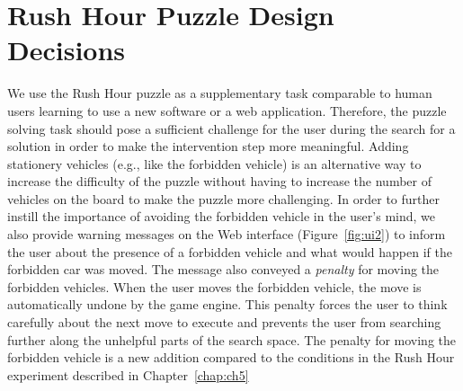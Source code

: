 \section{Rush Hour Puzzle Design Decisions}
We use the Rush Hour puzzle as a supplementary task comparable to human users learning to use a new software or a web application. 
Therefore, the puzzle solving task should pose a sufficient challenge for the user during the search for a solution in order to make the intervention step more meaningful. 
Adding stationery vehicles (e.g., like the forbidden vehicle) is an alternative way to increase the difficulty of the puzzle without having to increase the number of vehicles on the board \cite{fernau2003} to make the puzzle more challenging.
In order to further instill the importance of avoiding the forbidden vehicle in the user's mind, we also provide warning messages on the Web interface (Figure~\ref{fig:ui2}) to inform the user about the presence of a forbidden vehicle and what would happen if the forbidden car was moved. 
The message also conveyed a \textit{penalty} for moving the forbidden vehicles.
When the user moves the forbidden vehicle, the move is automatically undone by the game engine.
This penalty forces the user to think carefully about the next move to execute and prevents the user from searching further along the unhelpful parts of the search space.
The penalty for moving the forbidden vehicle is a new addition compared to the conditions in the Rush Hour experiment described in Chapter~\ref{chap:ch5}


